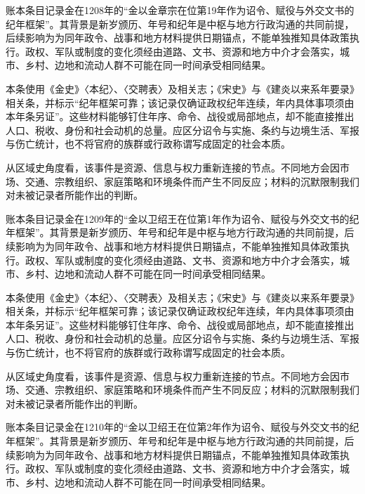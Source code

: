 账本条目记录金在1208年的“金以金章宗在位第19年作为诏令、赋役与外交文书的纪年框架”。其背景是新岁颁历、年号和纪年是中枢与地方行政沟通的共同前提，后续影响为为同年政令、战事和地方材料提供日期锚点，不能单独推知具体政策执行。政权、军队或制度的变化须经由道路、文书、资源和地方中介才会落实，城市、乡村、边地和流动人群不可能在同一时间承受相同结果。

本条使用《金史》〈本纪〉、〈交聘表〉及相关志；《宋史》与《建炎以来系年要录》相关条，并标示“纪年框架可靠；该记录仅确证政权纪年连续，年内具体事项须由本年条另证”。这些材料能够钉住年序、命令、战役或局部地点，却不能直接推出人口、税收、身份和社会动机的总量。应区分诏令与实施、条约与边境生活、军报与伤亡统计，也不将官府的族群或行政称谓写成固定的社会本质。

从区域史角度看，该事件是资源、信息与权力重新连接的节点。不同地方会因市场、交通、宗教组织、家庭策略和环境条件而产生不同反应；材料的沉默限制我们对未被记录者所能作出的判断。

账本条目记录金在1209年的“金以卫绍王在位第1年作为诏令、赋役与外交文书的纪年框架”。其背景是新岁颁历、年号和纪年是中枢与地方行政沟通的共同前提，后续影响为为同年政令、战事和地方材料提供日期锚点，不能单独推知具体政策执行。政权、军队或制度的变化须经由道路、文书、资源和地方中介才会落实，城市、乡村、边地和流动人群不可能在同一时间承受相同结果。

本条使用《金史》〈本纪〉、〈交聘表〉及相关志；《宋史》与《建炎以来系年要录》相关条，并标示“纪年框架可靠；该记录仅确证政权纪年连续，年内具体事项须由本年条另证”。这些材料能够钉住年序、命令、战役或局部地点，却不能直接推出人口、税收、身份和社会动机的总量。应区分诏令与实施、条约与边境生活、军报与伤亡统计，也不将官府的族群或行政称谓写成固定的社会本质。

从区域史角度看，该事件是资源、信息与权力重新连接的节点。不同地方会因市场、交通、宗教组织、家庭策略和环境条件而产生不同反应；材料的沉默限制我们对未被记录者所能作出的判断。

账本条目记录金在1210年的“金以卫绍王在位第2年作为诏令、赋役与外交文书的纪年框架”。其背景是新岁颁历、年号和纪年是中枢与地方行政沟通的共同前提，后续影响为为同年政令、战事和地方材料提供日期锚点，不能单独推知具体政策执行。政权、军队或制度的变化须经由道路、文书、资源和地方中介才会落实，城市、乡村、边地和流动人群不可能在同一时间承受相同结果。

